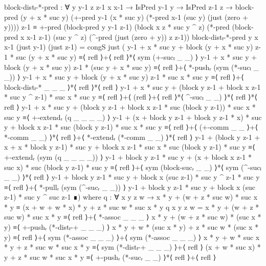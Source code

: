 \begin{code}[hide]
  block-distₗ-*-pred :
    ∀ {y y-1 z z-1} x x-1 → IsPred y-1 y → IsPred z-1 z →
    block-pred
      (y + x * suc y)
      (+-pred y-1 (x * suc y) (*-pred x-1 (suc y) (just (zero + y))))
      z-1 ≡
    +-pred
      (block-pred y y-1 z-1)
      (block x z * suc y ^ z)
      (*-pred
        (block-pred x x-1 z-1)
        (suc y ^ z)
        (^-pred (just (zero + y)) z z-1))
  block-distₗ-*-pred {y} x x-1 (just y-1) (just z-1) =
    congS just
      ( y-1 + x * suc y + block (y + x * suc y) z-1 * suc (y + x * suc y)                                   ≡⟨ refl ⟩+⟨ refl ⟩*⟨ sym (+-sucₗ _ _) ⟩
        y-1 + x * suc y + block (y + x * suc y) z-1 * (suc y + x * suc y)                                   ≡⟨ refl ⟩+⟨ *-pushᵣ (sym (*-sucₗ _ _)) ⟩
        y-1 + x * suc y + block (y + x * suc y) z-1 * suc x * suc y                                         ≡⟨ refl ⟩+⟨ block-distₗ-* _ _ _ ⟩*⟨ refl ⟩*⟨ refl ⟩
        y-1 + x * suc y + (block y z-1 + block x z-1 * suc y ^ z-1) * suc x * suc y                         ≡⟨ refl ⟩+⟨ (refl ⟩+⟨ refl ⟩*⟨ ^-sucₗ _ _) ⟩*⟨ refl ⟩*⟨ refl ⟩
        y-1 + x * suc y + (block y z-1 + block x z-1 * suc (block y z-1)) * suc x * suc y                   ≡⟨ +-extendᵣ (q _ _ _ _) ⟩
        y-1 + (x + block y z-1 + block y z-1 * x) * suc y + block x z-1 * suc (block y z-1) * suc x * suc y ≡⟨ refl ⟩+⟨ (+-comm _ _ ⟩+⟨ *-comm _ _) ⟩*⟨ refl ⟩+⟨ *-extendᵣ (*-comm _ _) ⟩*⟨ refl ⟩
        y-1 + (block y z-1 + x + x * block y z-1) * suc y + block x z-1 * suc x * suc (block y z-1) * suc y ≡⟨ +-extendᵣ (sym (q _ _ _ _)) ⟩
        y-1 + block y z-1 * suc y + (x + block x z-1 * suc x) * suc (block y z-1) * suc y                   ≡⟨ refl ⟩+⟨ sym (block-sucᵣ _ _) ⟩*⟨ sym (^-sucₗ _ _) ⟩*⟨ refl ⟩
        y-1 + block y z-1 * suc y + block x (suc z-1) * suc y ^ z-1 * suc y                                 ≡⟨ refl ⟩+⟨ *-pullᵣ (sym (^-sucᵣ _ _)) ⟩
        y-1 + block y z-1 * suc y + block x (suc z-1) * suc y ^ suc z-1                                     ∎)
    where
    q :
      ∀ x y z w →
      x * y + (w + z * suc w) * suc x * y ≡
      (x + w + w * x) * y + z * suc w * suc x * y
    q x y z w =
      x * y + (w + z * suc w) * suc x * y               ≡⟨ refl ⟩+⟨ *-assoc _ _ _ ⟩
      x * y + (w + z * suc w) * (suc x * y)             ≡⟨ +-pushᵣ (*-distₗ-+ _ _ _) ⟩
      x * y + w * (suc x * y) + z * suc w * (suc x * y) ≡⟨ refl ⟩+⟨ sym (*-assoc _ _ _) ⟩+⟨ sym (*-assoc _ _ _) ⟩
      x * y + w * suc x * y + z * suc w * suc x * y     ≡⟨ sym (*-distₗ-+ _ _ _) ⟩+⟨ refl ⟩
      (x + w * suc x) * y + z * suc w * suc x * y       ≡⟨ +-pushᵣ (*-sucᵣ _ _) ⟩*⟨ refl ⟩+⟨ refl ⟩

\end{code}
